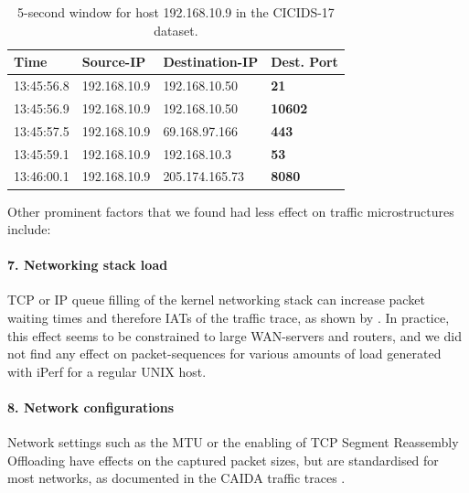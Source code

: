 \documentclass[runningheads]{llncs}
\begin{document}
\begin{table}[h!]
\centering
\begin{tabular}{l|l|l|>{\bfseries}l}
Time& Source-IP &Destination-IP& Dest. Port\\ \hline
13:45:56.8 & 192.168.10.9 & 192.168.10.50 &    21 \\ \hline
13:45:56.9 & 192.168.10.9 & 192.168.10.50 &  10602\\ \hline
13:45:57.5 & 192.168.10.9 & 69.168.97.166 &   443\\ \hline
13:45:59.1 & 192.168.10.9 &  192.168.10.3 &    53\\ \hline
13:46:00.1 & 192.168.10.9 & 205.174.165.73 &   8080\\ \hline
\end{tabular}
\caption{5-second window for host 192.168.10.9 in the CICIDS-17 dataset.}\label{Tab:Sess}
\end{table}


Other prominent factors that we found had less effect on traffic microstructures include:

\paragraph{7. Networking stack load}
TCP or IP queue filling of the kernel networking stack can increase packet waiting times and therefore IATs of the traffic trace, as shown by \cite{sequeira2013influence}. In practice, this effect seems to be constrained to large WAN-servers and routers, and we did not find any effect on packet-sequences for various amounts of load generated with iPerf for a regular UNIX host.



\paragraph{8. Network configurations}
Network settings such as the MTU or the enabling of TCP Segment Reassembly Offloading have effects on the captured packet sizes, but are standardised for most networks, as documented in the CAIDA traffic traces \cite{walsworth2015caida}.
\end{document}
